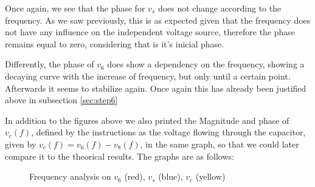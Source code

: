 Once again, we see that the phase for $v_s$ does not change according to the frequency. As we saw previously, this is as expected given that the frequency does not have any influence on the independent voltage source, therefore the phase remains equal to zero, considering that is it's inicial phase.\par
Differently, the phase of $v_6$ does show a dependency on the frequency, showing a decaying curve with the increase of frequency, but only until a certain point. Afterwards it seems to stabilize again. Once again this has already been justified above in subsection \ref{sec:step6}

In addition to the figures above we also printed the Magnitude and phase of $v_c(f)$, defined by the instructions as the voltage flowing through the capacitor, given by $v_c(f)=v_6(f)-v_8(f)$, in the same graph, so that we could later compare it to the theorical results. The graphs are as follows:

\FloatBarrier
\begin{figure}
	\centering
	\qquad
	\caption{Frequency analysis on $v_6$ (red), $v_s$ (blue), $v_c$ (yellow)}
	\label{fig:sim5.3}
\end{figure}
\FloatBarrier